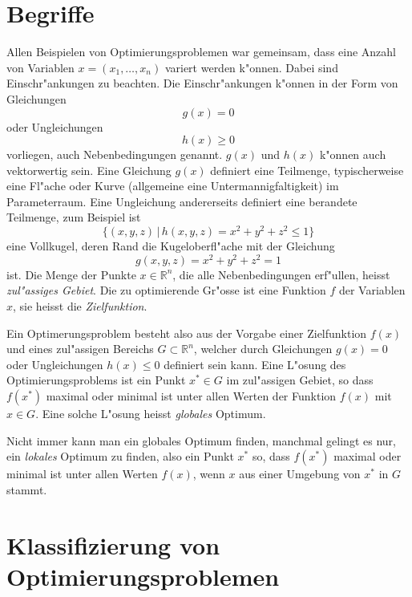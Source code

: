 \section{Begriffe\label{section-begriffe}}
Allen Beispielen von Optimierungsproblemen war gemeinsam, dass eine
Anzahl von Variablen $x=(x_1,\dots,x_n)$ variert werden k"onnen.
Dabei sind Einschr"ankungen zu beachten.
Die Einschr"ankungen k"onnen in der Form von Gleichungen
\begin{equation}
g(x)=0
\label{begriff-nebenbedingungen}
\end{equation}
oder Ungleichungen
\begin{equation}
h(x)\ge 0
\label{begriff-einschraenkungen}
\end{equation}
vorliegen, auch Nebenbedingungen genannt.
$g(x)$ und $h(x)$ k"onnen auch vektorwertig sein.
Eine Gleichung $g(x)$ definiert eine Teilmenge, typischerweise eine
Fl"ache oder Kurve (allgemeine eine Untermannigfaltigkeit) im 
Parameterraum.
Eine Ungleichung andererseits definiert eine berandete Teilmenge,
zum Beispiel ist
\[
\{(x,y,z)\,|\,h(x,y,z)=x^2+y^2+z^2\le 1\}
\]
eine Vollkugel, deren Rand die Kugeloberfl"ache mit der Gleichung
\[
g(x,y,z)=x^2+y^2+z^2=1
\]
ist.
Die Menge der Punkte $x\in\mathbb R^n$, die alle Nebenbedingungen
erf"ullen, heisst {\it zul"assiges Gebiet}.
Die zu optimierende Gr"osse ist eine Funktion $f$ der Variablen $x$,
sie heisst die {\it Zielfunktion}.

Ein Optimerungsproblem besteht also aus der Vorgabe einer Zielfunktion
$f(x)$ und eines zul"assigen Bereichs $G\subset \mathbb R^n$, welcher
durch Gleichungen $g(x)=0$ oder Ungleichungen $h(x)\le 0$ 
definiert sein kann.
Eine L"osung des Optimierungsproblems ist ein Punkt $x^*\in G$ im zul"assigen
Gebiet, so dass $f(x^*)$ maximal oder minimal ist unter allen Werten
der Funktion $f(x)$ mit $x\in G$. Eine solche L"osung heisst
{\it globales} Optimum.

Nicht immer kann man ein globales Optimum finden, manchmal gelingt es
nur, ein {\it lokales} Optimum zu finden, also ein Punkt $x^*$ so,
dass $f(x^*)$ maximal oder minimal ist unter allen Werten $f(x)$,
wenn $x$ aus einer Umgebung von $x^*$ in $G$ stammt.



\section{Klassifizierung von Optimierungsproblemen\label{section-klassifizierung}}
